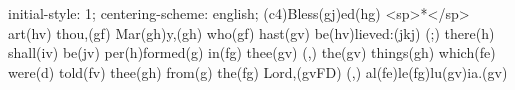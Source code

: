 initial-style: 1;
centering-scheme: english;
(c4)Bless(gj)ed(hg) <sp>*</sp> art(hv) thou,(gf) Mar(gh)y,(gh) who(gf) hast(gv) be(hv)lieved:(jkj) (;) there(h) shall(iv) be(jv) per(h)formed(g) in(fg) thee(gv) (,) the(gv) things(gh) which(fe) were(d) told(fv) thee(gh) from(g) the(fg) Lord,(gvFD) (,) al(fe)le(fg)lu(gv)ia.(gv)
